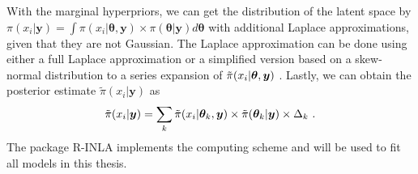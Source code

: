 With the marginal hyperpriors, we can get the distribution of the latent space by $\pi(x_i | \bm y)=\int \pi(x_i|\bm\theta,\bm y)\times\pi(\bm\theta|\bm y)d\bm\theta$ with additional Laplace approximations, given that they are not Gaussian. The Laplace approximation can be done using either a full Laplace approximation or a simplified version based on a skew-normal distribution to a series expansion of $\Tilde{\pi}(x_i|\bm\theta, \bm y)$ \autocite{inla-lecturenotes}.
Lastly, we can obtain the posterior estimate $\tilde{\pi}(x_i | \bm y)$ as
\begin{equation}
    \Tilde{\pi}(x_i | \bm y) = \sum_k
    \Tilde{\pi}(x_i | \bm \theta_k, \bm y) \times \tilde{\pi}(\bm\theta_k|\bm y) \times \Delta_k \ .
\end{equation}
The package R-INLA \autocite{inla2009} implements the computing scheme and will be used to fit all models in this thesis.


